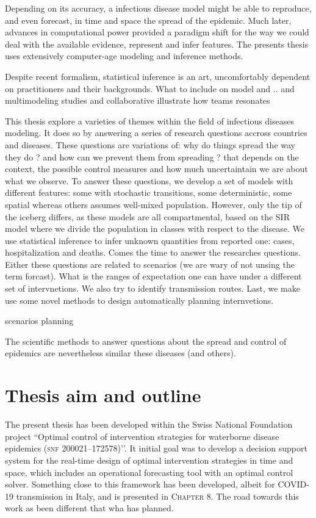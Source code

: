Depending on its accuracy, a infectious disease model might be able to reproduce, and even forecast, in time and space the spread of the epidemic. Much later, advances in computational power provided a paradigm shift for the way we could deal with the available evidence, represent and infer features. 
The presents thesis uses extensively computer-age modeling and inference methods. 

Despite recent formalism, statistical inference is an art, uncomfortably dependent on practitioners and their backgrounds. What to include on model and .. and multimodeling studies and collaborative illustrate how teams resonates

This thesis explore a varieties of themes within the field of infectious diseases modeling. It does so by answering a series of research questions accross countries and diseases. These questions are variations of: why do things spread the way they do ? and how can we prevent them from spreading ? that depends on the context, the possible control measures and how much uncertaintain we are about what we observe.
To answer these questions, we develop a set of models with different features: some with stochastic transitions, some deterministic, some spatial whereas others assumes well-mixed population. However, only the tip of the iceberg differs, as these models are all compartmental, based on the SIR model where we divide the population in classes with respect to the disease. We use statistical inference to infer unknown quantities from reported one: cases, hospitalization and deaths. Comes the time to answer the researches questions. Either these questions are related to scenarios (we are wary of not unsing the term forcast). What is the ranges of expectation one can have under a different set of intervnetions. We also try to identify transmission routes.  
Last, we make use some novel methods to design automatically planning internvetions.

\cite{Buckee:ThinkingClearlySocial:2021}
scenarios planning

The scientific methods to answer questions about the spread and control of epidemics are nevertheless similar these diseases (and others).

\section{Thesis aim and outline} %
The present thesis has been developed within the Swiss National Foundation project ``Optimal control of intervention strategies for waterborne disease epidemics (\textsc{snf} 200021–172578)’’. It initial goal was to develop a decision support system for the real-time design of optimal intervention strategies in time and space, which includes an operational forecasting tool with an optimal control solver. Something close to this framework has been developed, albeit for COVID-19 transmission in Italy, and is presented in \textsc{Chapter 8}. The road towards this work as been different that wha has planned.

